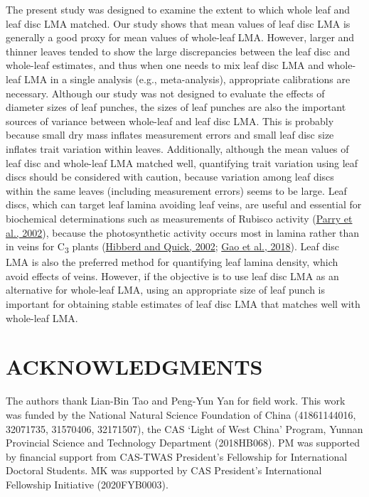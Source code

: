 \documentclass[
  12pt,
  a4paper,
,tablecaptionabove
]{scrartcl}
\begin{document}
The present study was designed to examine the extent to which whole leaf
and leaf disc LMA matched. Our study shows that mean values of leaf disc
LMA is generally a good proxy for mean values of whole-leaf LMA.
However, larger and thinner leaves tended to show the large
discrepancies between the leaf disc and whole-leaf estimates, and thus
when one needs to mix leaf disc LMA and whole-leaf LMA in a single
analysis (e.g., meta-analysis), appropriate calibrations are necessary.
Although our study was not designed to evaluate the effects of diameter
sizes of leaf punches, the sizes of leaf punches are also the important
sources of variance between whole-leaf and leaf disc LMA. This is
probably because small dry mass inflates measurement errors and small
leaf disc size inflates trait variation within leaves. Additionally,
although the mean values of leaf disc and whole-leaf LMA matched well,
quantifying trait variation using leaf discs should be considered with
caution, because variation among leaf discs within the same leaves
(including measurement errors) seems to be large. Leaf discs, which can
target leaf lamina avoiding leaf veins, are useful and essential for
biochemical determinations such as measurements of Rubisco activity
(\protect\hyperlink{ref-Parry2002}{Parry et al., 2002}), because the
photosynthetic activity occurs most in lamina rather than in veins for
C\textsubscript{3} plants (\protect\hyperlink{ref-Hibberd2002}{Hibberd
and Quick, 2002}; \protect\hyperlink{ref-Gao2018}{Gao et al., 2018}).
Leaf disc LMA is also the preferred method for quantifying leaf lamina
density, which avoid effects of veins. However, if the objective is to
use leaf disc LMA as an alternative for whole-leaf LMA, using an
appropriate size of leaf punch is important for obtaining stable
estimates of leaf disc LMA that matches well with whole-leaf LMA.

\hypertarget{acknowledgments}{%
\section{ACKNOWLEDGMENTS}\label{acknowledgments}}

The authors thank Lian-Bin Tao and Peng-Yun Yan for field work. This
work was funded by the National Natural Science Foundation of China
(41861144016, 32071735, 31570406, 32171507), the CAS `Light of West
China' Program, Yunnan Provincial Science and Technology Department
(2018HB068). PM was supported by financial support from CAS-TWAS
President's Fellowship for International Doctoral Students. MK was
supported by CAS President's International Fellowship Initiative
(2020FYB0003).
\end{document}
